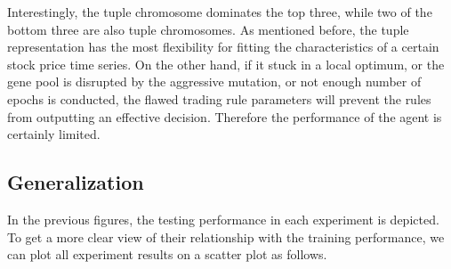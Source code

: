 \documentclass{article}
\begin{document}
Interestingly, the tuple chromosome dominates the top three,
while two of the bottom three are also tuple chromosomes.
As mentioned before, the tuple representation has the most flexibility
for fitting the characteristics of a certain stock price time series.
On the other hand, if it stuck in a local optimum, or the gene pool is disrupted by the aggressive mutation,
or not enough number of epochs is conducted,
the flawed trading rule parameters will prevent the rules from outputting an effective decision.
Therefore the performance of the agent is certainly limited.

\subsection{Generalization}\label{subsection-generalization}

In the previous figures, the testing performance in each experiment is depicted.
To get a more clear view of their relationship with the training performance,
we can plot all experiment results on a scatter plot as follows.
\end{document}

